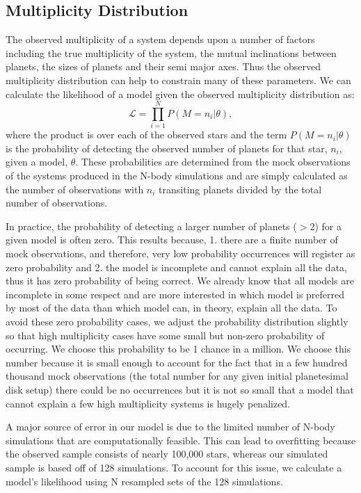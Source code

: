 \documentclass{emulateapj}
\begin{document}
 \subsection{Multiplicity Distribution}
The observed multiplicity of a system depends upon a number of factors including the true multiplicity of the system, the mutual inclinations between planets, the sizes of planets and their semi major axes. Thus the observed multiplicity distribution can help to constrain many of these parameters. We can calculate the likelihood of a model given the observed multiplicity distribution as:
\begin{equation}
\mathcal{L} = \prod_{i=1}^N P(M=n_i|\theta),
\end{equation}
where the product is over each of the observed stars and the term $P(M=n_i|\theta)$ is the probability of detecting the observed number of planets for that star, $n_i$, given a model, $\theta$. These probabilities are determined from the mock observations of the systems produced in the N-body simulations and are simply calculated as the number of observations with $n_i$ transiting planets divided by the total number of observations.

In practice, the probability of detecting a larger number of planets ($>$2) for a given model is often zero. This results because, 1. there are a finite number of mock observations, and therefore, very low probability occurrences will register as zero probability and 2. the model is incomplete and cannot explain all the data, thus it has zero probability of being correct. We already know that all models are incomplete in some respect and are more interested in which model is preferred by most of the data than which model can, in theory, explain all the data. To avoid these zero probability cases, we adjust the probability distribution slightly so that high multiplicity cases have some small but non-zero probability of occurring. We choose this probability to be 1 chance in a million. We choose this number because it is small enough to account for the fact that in a few hundred thousand mock observations (the total number for any given initial planetesimal disk setup) there could be no occurrences but it is not so small that a model that cannot explain a few high multiplicity systems is hugely penalized.

 A major source of error in our model is due to the limited number of N-body simulations that are computationally feasible. This can lead to overfitting because the observed sample consists of nearly 100,000 stars, whereas our simulated sample is based off of 128 simulations. To account for this issue, we calculate a model's likelihood using N resampled sets of the 128 simulations.
\end{document}
